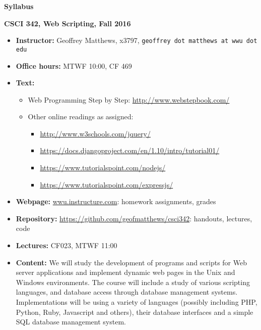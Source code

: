 \documentclass{article}
\begin{document}
\centerline{\large \bf Syllabus}

\centerline{\bf CSCI 342, Web Scripting, Fall 2016}

\begin{itemize}

\item
{\bf Instructor:} Geoffrey Matthews, x3797, {\tt  geoffrey dot matthews at wwu dot edu}
\item
{\bf Office hours:} MTWF 10:00, CF 469
\item
{\bf Text:} \begin{itemize}\item
Web Programming Step by Step: \url{http://www.webstepbook.com/}
\item
  Other online readings as assigned:
  \begin{itemize}
  \item \url{http://www.w3schools.com/jquery/}
  \item \url{https://docs.djangoproject.com/en/1.10/intro/tutorial01/}
  \item \url{https://www.tutorialspoint.com/nodejs/}
  \item \url{https://www.tutorialspoint.com/expressjs/}
  \end{itemize}
\end{itemize}
\item {\bf Webpage:}  \url{wwu.instructure.com}:  homework assignments, grades
\item {\bf Repository:} \url{https://github.com/geofmatthews/csci342}:  handouts, lectures, code
\item
{\bf Lectures:} 
CF023, MTWF 11:00

\item
{\bf Content:} We will study the development of programs and scripts
for Web server applications and implement dynamic web pages in the
Unix and Windows environments.  The course will include a study of
various scripting languages, and database access through database
management systems.  Implementations will be using a variety of
languages (possibly including PHP, Python, Ruby, Javascript and
others), their database interfaces and a simple SQL database
management system.


\end{itemize}
\end{document}
